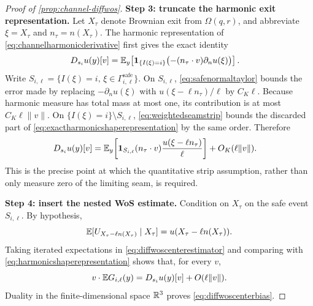 \begin{proof}[Proof of \cref{prop:channel-diffwos}]
\textbf{Step 3: truncate the harmonic exit representation.}
Let $X_\tau$ denote Brownian exit from $\Omega(q,r)$, and abbreviate
$\xi=X_\tau$ and $n_\tau=n(X_\tau)$.  The harmonic representation of
\cref{eq:channelharmonicderivative} first gives the exact identity
\begin{align}
 D_{s_i}u(y)[v]
 &=\mathbb{E}_y\!\left[
   \mathbf 1_{\{I(\xi)=i\}}
   \bigl(-(n_\tau\cdot v)\partial_nu(\xi)\bigr)\right].
 \label{eq:exactharmonicshaperepresentation}
\end{align}
Write $S_{i,\ell}=\{I(\xi)=i,\,
\xi\in\Gamma_{i,\ell}^{\mathrm{safe}}\}$.  On $S_{i,\ell}$,
\cref{eq:safenormaltaylor} bounds the error made by replacing
$-\partial_nu(\xi)$ with $u(\xi-\ell n_\tau)/\ell$ by $C_K\ell$.
Because harmonic measure has total mass at most one, its contribution is at
most $C_K\ell\|v\|$.  On $\{I(\xi)=i\}\setminus S_{i,\ell}$,
\cref{eq:weightedseamstrip} bounds the discarded part of
\cref{eq:exactharmonicshaperepresentation} by the same order.  Therefore
\begin{align}
 D_{s_i}u(y)[v]
 &=\mathbb{E}_y\!\left[
   \mathbf 1_{S_{i,\ell}}(n_\tau\cdot v)
   \frac{u(\xi-\ell n_\tau)}{\ell}\right]
   +O_K(\ell\|v\|).
 \label{eq:harmonicshaperepresentation}
\end{align}
This is the precise point at which the quantitative strip assumption, rather
than only measure zero of the limiting seam, is required.

\textbf{Step 4: insert the nested WoS estimate.}
Condition on $X_\tau$ on the safe event $S_{i,\ell}$.  By hypothesis,
\begin{equation}
 \mathbb{E}[U_{X_\tau-\ell n(X_\tau)}\mid X_\tau]
 =u(X_\tau-\ell n(X_\tau)).
\end{equation}
Taking iterated expectations in \cref{eq:diffwoscenterestimator} and comparing
with \cref{eq:harmonicshaperepresentation} shows that, for every $v$,
\begin{equation}
 v\cdot\mathbb{E} G_{i,\ell}(y)
 =D_{s_i}u(y)[v]+O(\ell\|v\|).
\end{equation}
Duality in the finite-dimensional space $\mathbb{R}^3$ proves
\cref{eq:diffwoscenterbias}.


\end{proof}
